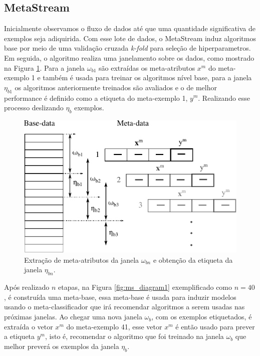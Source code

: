 \documentclass[conference,compsoc]{IEEEtran}
\begin{document}
\subsection{MetaStream}
\label{metastream}
Inicialmente observamos o fluxo de dados até que uma quantidade significativa de exemplos seja adiquirida. Com esse lote de dados, o MetaStream induz algoritmos base por meio de uma validação cruzada \textit{k-fold} para seleção de hiperparametros. Em seguida, o algoritmo realiza uma janelamento sobre os dados, como mostrado na Figura \ref{fig:ms_diag0_off}. Para a janela $\omega_{b1}$ são extraídas os meta-atributos $x^m$ do meta-exemplo 1 e também é usada para treinar os algoritmos nível base, para a janela $\eta_{b1}$ os algoritmos anteriormente treinados são avaliados e o de melhor performance é definido como a etiqueta do meta-exemplo 1, $y^m$. Realizando esse processo deslizando $\eta_b$ exemplos.

\begin{figure}[ht]
    \centering
    \includegraphics[width=\linewidth]{imgs/ms_diag0_off.pdf}
    \caption{Extração de meta-atributos da janela $\omega_{bn}$ e obtenção da etiqueta da janela $\eta_{bn}$.}
    \label{fig:ms_diag0_off}
\end{figure}

Após realizado $n$ etapas, na Figura \ref{fig:ms_diagram1} exemplificado como $n=40$, é construída uma meta-base, essa meta-base é usada para induzir modelos usando o meta-classificador que irá recomendar algoritmos a serem usadas nas próximas janelas. Ao chegar uma nova janela $\omega_b$, com os exemplos etiquetados, é extraída o vetor $x^m$ do meta-exemplo 41, esse vetor $x^m$ é então usado para prever a etiqueta $y^m$, isto é, recomendar o algoritmo que foi treinado na janela $\omega_b$ que melhor preverá os exemplos da janela $\eta_b$.
\end{document}

